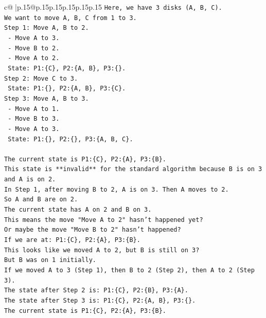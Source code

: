 \documentclass{article}
\begin{document}
{\begin{supertabular}{c@{$\;$}|p{.15\linewidth}@{}p{.15\linewidth}p{.15\linewidth}p{.15\linewidth}p{.15\linewidth}p{.15\linewidth}}
{{{\texttt{Here, we have 3 disks (A, B, C).} \\
\texttt{We want to move A, B, C from 1 to 3.} \\
\texttt{Step 1: Move A, B to 2.} \\
\texttt{   {-} Move A to 3.} \\
\texttt{   {-} Move B to 2.} \\
\texttt{   {-} Move A to 2.} \\
\texttt{   State: P1:\{C\}, P2:\{A, B\}, P3:\{\}.} \\
\texttt{Step 2: Move C to 3.} \\
\texttt{   State: P1:\{\}, P2:\{A, B\}, P3:\{C\}.} \\
\texttt{Step 3: Move A, B to 3.} \\
\texttt{   {-} Move A to 1.} \\
\texttt{   {-} Move B to 3.} \\
\texttt{   {-} Move A to 3.} \\
\texttt{   State: P1:\{\}, P2:\{\}, P3:\{A, B, C\}.} \\
\\ 
\texttt{The current state is P1:\{C\}, P2:\{A\}, P3:\{B\}.} \\
\texttt{This state is **invalid** for the standard algorithm because B is on 3 and A is on 2.} \\
\texttt{In Step 1, after moving B to 2, A is on 3. Then A moves to 2.} \\
\texttt{So A and B are on 2.} \\
\texttt{The current state has A on 2 and B on 3.} \\
\texttt{This means the move "Move A to 2" hasn't happened yet?} \\
\texttt{Or maybe the move "Move B to 2" hasn't happened?} \\
\texttt{If we are at: P1:\{C\}, P2:\{A\}, P3:\{B\}.} \\
\texttt{This looks like we moved A to 2, but B is still on 3?} \\
\texttt{But B was on 1 initially.} \\
\texttt{If we moved A to 3 (Step 1), then B to 2 (Step 2), then A to 2 (Step 3).} \\
\texttt{The state after Step 2 is: P1:\{C\}, P2:\{B\}, P3:\{A\}.} \\
\texttt{The state after Step 3 is: P1:\{C\}, P2:\{A, B\}, P3:\{\}.} \\
\texttt{The current state is P1:\{C\}, P2:\{A\}, P3:\{B\}.} \\
}}}
\end{supertabular}}
\end{document}
